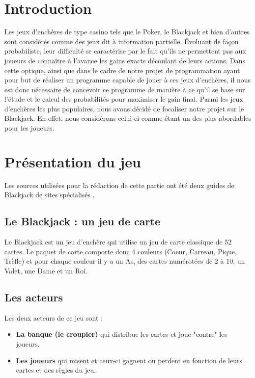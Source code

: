 \section{Introduction}
Les jeux d'enchères de type casino tels que le Poker, le Blackjack et bien d'autres sont considérés comme des jeux dit à information partielle. Évoluant de façon probabiliste, leur difficulté se caractérise par le fait qu'ils ne permettent pas aux joueurs de connaître à l'avance les gains exacts découlant de leurs actions. Dans cette optique, ainsi que dans le cadre de notre projet de programmation ayant pour but de réaliser un programme capable de jouer à ces jeux d'enchères, il nous est donc nécessaire de concevoir ce programme de manière à ce qu'il se base sur l'étude et le calcul des probabilités pour maximiser le gain final. Parmi les jeux d'enchères les plus populaires, nous avons décidé de focaliser notre projet sur le  Blackjack. En effet, nous considérons celui-ci comme étant un des plus abordables pour les joueurs. 

\section{Présentation du jeu}

Les sources utilisées pour la rédaction de cette partie ont été deux guides de Blackjack de sites spécialisés \cite{blackjack_regles_1} \cite{blackjack_regles_2}.

\subsection{Le Blackjack : un jeu de carte}

Le Blackjack est un jeu d'enchère qui utilise un jeu de carte classique de 52 cartes. Le paquet de carte comporte donc 4 couleurs (Coeur, Carreau, Pique, Trèfle) et pour chaque couleur il y a un As, des cartes numérotées de 2 à 10, un Valet, une Dame et un Roi.

\subsection{Les acteurs}

Les deux acteurs de ce jeu sont :
\begin{itemize}
    \item \textbf{La banque (le croupier)} qui distribue les cartes et joue "contre" les joueurs.
    \item \textbf{Les joueurs} qui misent et ceux-ci gagnent ou perdent en fonction de leurs cartes et des règles du jeu.
\end{itemize}

